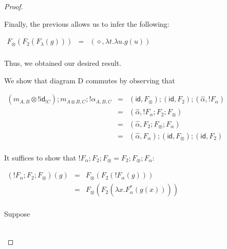 \documentclass{elsarticle}
\newcommand{\id}[0]{\mathsf{id}}
\begin{document}
\begin{proof}
\begin{report}
\begin{center}
\begin{itemize}
\begin{center}
      \end{center}
      Finally, the previous allows us to infer the following:
      \begin{center}
        \begin{math}
          \begin{array}{lll}
            F_\otimes(F_2(F_\lambda(g)))
            & = & (\diamond, \lambda t.\lambda u.g(u))\\
          \end{array}
        \end{math}
      \end{center}
      Thus, we obtained our desired result.

      \noindent
      We show that diagram D commutes by observing that
      \begin{center}
        \begin{math}
          \begin{array}{lll}
            (m_{A,B} \otimes !\id_{!C});m_{A\otimes B,C};!\alpha_{A,B,C}
            & = & (\id,F_\otimes);(\id,F_2);(\hat{\alpha},!F_\alpha)\\
            & = & (\hat{\alpha},!F_\alpha;F_2;F_\otimes)\\
            & = & (\hat{\alpha},F_2;F_\otimes;F_\alpha)\\
            & = & (\hat{\alpha},F_\alpha);(\id,F_\otimes);(\id,F_2)\\
          \end{array}
        \end{math}
      \end{center}
      It suffices to show that $!F_\alpha;F_2;F_\otimes = F_2;F_\otimes;F_\alpha$:
      \begin{center}
        \begin{math}
          \begin{array}{lll}
            (!F_\alpha;F_2;F_\otimes)(g)
            & = & F_\otimes(F_2(!F_\alpha(g)))\\
            & = & F_\otimes(F_2(\lambda x.F^*_\alpha(g(x))))\\
          \end{array}
        \end{math}
      \end{center}
      Suppose
      \begin{center}
        \vspace{-20px}
        \begin{math}
          \begin{array}{lll}

\end{array}
\end{math}
\end{center}
\end{itemize}
\end{center}
\end{report}
\end{proof}
\end{document}
